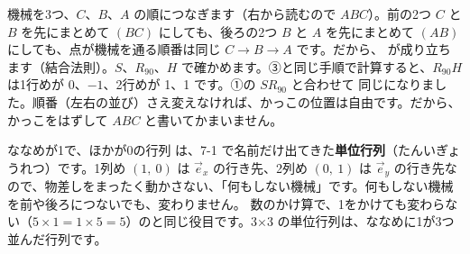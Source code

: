 \label{bk:7-3:ketsugo}

機械を3つ、$C$、$B$、$A$ の順につなぎます（右から読むので $ABC$）。前の2つ $C$ と $B$ を先にまとめて $(BC)$ にしても、後ろの2つ $B$ と $A$ を先にまとめて $(AB)$ にしても、点が機械を通る順番は同じ $C\to B\to A$ です。だから、
が成り立ちます（結合法則）。$S$、$R_{90}$、$H$ で確かめます。③と同じ手順で計算すると、$R_{90}H$ は1行めが 0、$-1$、2行めが 1、1 です。①の $SR_{90}$ と合わせて
同じになりました。順番（左右の並び）さえ変えなければ、かっこの位置は自由です。だから、かっこをはずして $ABC$ と書いてかまいません。

ななめが1で、ほかが0の行列
は、7-1 で名前だけ出てきた\textbf{単位行列}（たんいぎょうれつ）です。1列め $(1,\ 0)$ は $\vec e_x$ の行き先、2列め $(0,\ 1)$ は $\vec e_y$ の行き先なので、物差しをまったく動かさない、「何もしない機械」です。何もしない機械を前や後ろにつないでも、変わりません。
数のかけ算で、1をかけても変わらない（$5\times1=1\times5=5$）のと同じ役目です。3×3 の単位行列は、ななめに1が3つ並んだ行列です。

